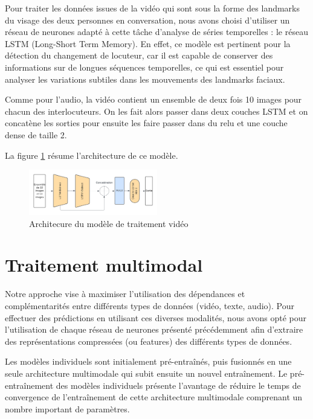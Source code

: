 \documentclass[a4paper]{article}
\begin{document}
Pour traiter les données issues de la vidéo qui sont sous la forme des landmarks du visage des deux personnes en conversation, nous avons choisi d'utiliser un réseau de neurones adapté à cette tâche d'analyse de séries temporelles : le réseau LSTM (Long-Short Term Memory). En effet, ce modèle est pertinent pour la détection du changement de locuteur, car il est capable de conserver des informations sur de longues séquences temporelles, ce qui est essentiel pour analyser les variations subtiles dans les mouvements des landmarks faciaux. 

Comme pour l'audio, la vidéo contient un ensemble de deux fois 10 images pour chacun des interlocuteurs. On les fait alors passer dans deux couches LSTM et on concatène les sorties pour ensuite les faire passer dans du relu et une couche dense de taille 2.

La figure \ref{fig: model_video} résume l'architecture de ce modèle.

\begin{figure}[H]
    \centering
    \includegraphics[width=0.5\textwidth]{Traitement_video_SAM.png}
    \caption{Architecure du modèle de traitement vidéo}
    \label{fig: model_video}
\end{figure}

\section{Traitement multimodal}

Notre approche vise à maximiser l'utilisation des dépendances et complémentarités entre différents types de données (vidéo, texte, audio). Pour effectuer des prédictions en utilisant ces diverses modalités, nous avons opté pour l'utilisation de chaque réseau de neurones présenté précédemment afin d'extraire des représentations compressées (ou features) des différents types de données. 

Les modèles individuels sont initialement pré-entraînés, puis fusionnés en une seule architecture multimodale qui subit ensuite un nouvel entraînement. Le pré-entraînement des modèles individuels présente l'avantage de réduire le temps de convergence de l'entraînement de cette architecture multimodale comprenant un nombre important de paramètres.
\end{document}
